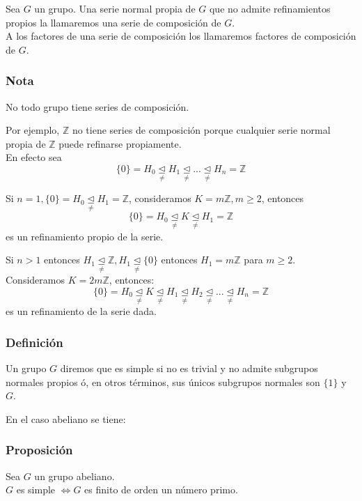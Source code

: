 \documentclass[11pt,a4paper]{article}
\begin{document}
Sea $G$ un grupo. Una serie normal propia de $G$ que no admite refinamientos propios la llamaremos una serie de composición de $G$. \\
A los factores de una serie de composición los llamaremos factores de composición de $G$.

\subsubsection*{Nota}

No todo grupo tiene series de composición.

Por ejemplo, $\mathbb{Z}$ no tiene series de composición porque cualquier serie normal propia de $\mathbb{Z}$ puede refinarse propiamente. \\
En efecto sea
$$\{0\} = H_{0} \underset{\neq}{\unlhd} H_{1} \underset{\neq}{\unlhd} ... \underset{\neq}{\unlhd} H_{n} = \mathbb{Z}$$

Si $n = 1, \{0\} = H_{0} \underset{\neq}{\unlhd} H_{1} = \mathbb{Z}$, consideramos $K = m\mathbb{Z}, m \geq 2$, entonces
$$\{0\} = H_{0} \underset{\neq}{\unlhd} K \underset{\neq}{\unlhd} H_{1} = \mathbb{Z}$$
es un refinamiento propio de la serie.

Si $n > 1$ entonces $H_{1} \underset{\neq}{\unlhd} \mathbb{Z}, H_{1} \underset{\neq}{\unlhd} \{0\}$ entonces $H_{1} = m\mathbb{Z}$ para $m \geq 2$. \\
Consideramos $K = 2m\mathbb{Z}$, entonces:
$$\{0\} = H_{0} \underset{\neq}{\unlhd} K \underset{\neq}{\unlhd} H_{1} \underset{\neq}{\unlhd} H_{2} \underset{\neq}{\unlhd} ... \underset{\neq}{\unlhd} H_{n} = \mathbb{Z}$$
es un refinamiento de la serie dada.

\subsubsection*{Definición}

Un grupo $G$ diremos que es simple si no es trivial y no admite subgrupos normales propios ó, en otros términos, sus únicos subgrupos normales son $\{1\}$ y $G$.

En el caso abeliano se tiene:

\subsubsection*{Proposición}

Sea $G$ un grupo abeliano. \\
$G$ es simple $\iff G$ es finito de orden un número primo.
\end{document}

